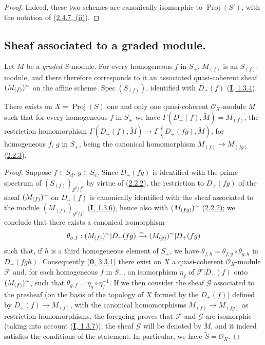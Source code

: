 \begin{proof}
Indeed, these two schemes are canonically isomorphic to
$\operatorname{Proj}(S')$, with the notation of
(\hyperref[II.2.4.7]{2.4.7, (ii)}).
\end{proof}

\subsection{Sheaf associated to a graded module.}
\label{subsection:II.2.5}

\begin{env}[2.5.1]
\label{II.2.5.1}
Let $M$ be a \emph{graded} $S$-module. For every homogeneous $f$ in $S_+$,
$M_{(f)}$ is an $S_{(f)}$-module, and there therefore corresponds to it an
associated quasi-coherent sheaf $(M_{(f)})^{\sim}$ on the affine scheme
$\operatorname{Spec}(S_{(f)})$, identified with $D_+(f)$
(\hyperref[I.1.3.4]{\textbf{I}, 1.3.4}).
\end{env}

\begin{proposition}[2.5.2]
\label{II.2.5.2}
There exists on $X=\operatorname{Proj}(S)$ one and only one quasi-coherent
$\mathcal{O}_X$-module $\widetilde{M}$ such that for every homogeneous $f$ in
$S_+$ we have
$\Gamma(D_+(f),\widetilde{M})=M_{(f)}$, the restriction homomorphism
$\Gamma(D_+(f),\widetilde{M})\to
\Gamma(D_+(fg),\widetilde{M})$, for homogeneous $f$, $g$ in $S_+$, being
the canonical homomorphism $M_{(f)}\to M_{(fg)}$
\textup{(\hyperref[II.2.2.3]{2.2.3})}.
\end{proposition}

\begin{proof}
Suppose $f\in S_d$, $g\in S_e$. Since $D_+(fg)$ is identified with the
prime spectrum of $(S_{(f)})_{g^d/f^e}$ by virtue of
(\hyperref[II.2.2.2]{2.2.2}), the restriction to $D_+(fg)$ of the sheaf
$(M_{(f)})^{\sim}$ on $D_+(f)$ is canonically identified with the sheaf
associated to the module $(M_{(f)})_{g^d/f^e}$
(\hyperref[I.1.3.6]{\textbf{I}, 1.3.6}), hence also with
$(M_{(fg)})^{\sim}$ (\hyperref[II.2.2.2]{2.2.2}); we conclude
that there exists a canonical isomorphism
\[
  \theta_{g,f}:(M_{(f)})^{\sim}|D_+(fg)
  \xrightarrow{\sim}(M_{(g)})^{\sim}|D_+(fg)
\]
such that, if $h$ is a third homogeneous element of $S_+$, we have
$\theta_{f,h}=\theta_{f,g}\circ\theta_{g,h}$ in $D_+(fgh)$. Consequently
(\hyperref[0.3.3.1]{\textbf{0}, 3.3.1}) there exist on $X$ a quasi-coherent
$\mathcal{O}_X$-module $\mathcal{F}$ and, for each homogeneous $f$
in $S_+$, an isomorphism $\eta_f$ of
$\mathcal{F}|D_+(f)$ onto $(M_{(f)})^{\sim}$, such that
$\theta_{g,f}=\eta_g\circ\eta_f^{-1}$. If we then consider the sheaf
$\mathcal{G}$ associated to the presheaf (on the basis of the topology of
$X$ formed by the $D_+(f)$) defined by $D_+(f)\to M_{(f)}$, with the
canonical homomorphisms $M_{(f)}\to M_{(fg)}$ as restriction
homomorphisms, the foregoing proves that $\mathcal{F}$ and $\mathcal{G}$
are isomorphic (taking into account (\hyperref[I.1.3.7]{\textbf{I}, 1.3.7})); the
sheaf $\mathcal{G}$ will be denoted by $\widetilde{M}$, and it indeed
satisfies the conditions of the statement. In particular, we have
$\widetilde{S}=\mathcal{O}_X$.
\end{proof}

